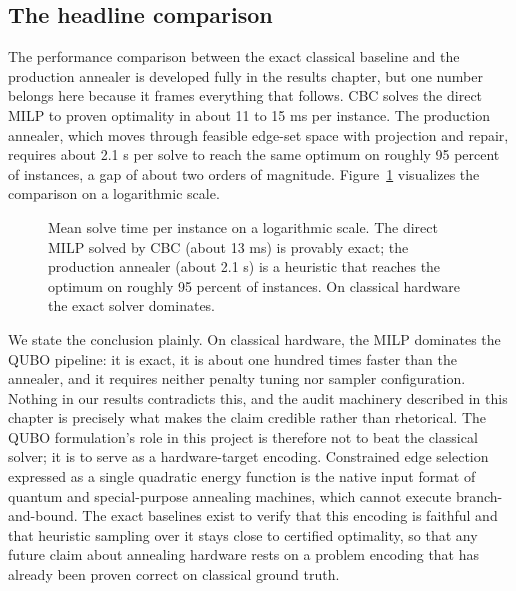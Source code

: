 \subsection{The headline comparison}

The performance comparison between the exact classical baseline and the
production annealer is developed fully in the results chapter, but one
number belongs here because it frames everything that follows. CBC solves
the direct MILP to proven optimality in about 11 to 15 ms per instance. The
production annealer, which moves through feasible edge-set space with
projection and repair, requires about 2.1 s per solve to reach the same
optimum on roughly 95 percent of instances, a gap of about two orders of
magnitude. Figure~\ref{fig:solvetime} visualizes the comparison on a
logarithmic scale.

\begin{figure}[htbp]
  \centering
  \caption{Mean solve time per instance on a logarithmic scale. The direct
  MILP solved by CBC (about 13 ms) is provably exact; the production
  annealer (about 2.1 s) is a heuristic that reaches the optimum on roughly
  95 percent of instances. On classical hardware the exact solver
  dominates.}
  \label{fig:solvetime}
\end{figure}

We state the conclusion plainly. On classical hardware, the MILP dominates
the QUBO pipeline: it is exact, it is about one hundred times faster than
the annealer, and it requires neither penalty tuning nor sampler
configuration. Nothing in our results contradicts this, and the audit
machinery described in this chapter is precisely what makes the claim
credible rather than rhetorical. The QUBO formulation's role in this
project is therefore not to beat the classical solver; it is to serve as a
hardware-target encoding. Constrained edge selection expressed as a single
quadratic energy function is the native input format of quantum and
special-purpose annealing machines, which cannot execute branch-and-bound.
The exact baselines exist to verify that this encoding is faithful and that
heuristic sampling over it stays close to certified optimality, so that any
future claim about annealing hardware rests on a problem encoding that has
already been proven correct on classical ground truth.
